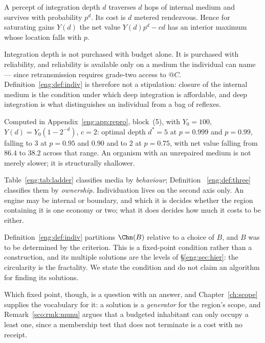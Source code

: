 \begin{proposition}
\label{eng:prop:fragile}
A percept of integration depth $d$ traverses $d$ hops of internal medium
and survives with probability $p^d$. Its cost is $d$ metered rendezvous.
Hence for saturating gains $Y(d)$ the net value $Y(d)p^d - cd$ has an
interior maximum whose location falls with $p$.
\end{proposition}

\begin{corollary}\label{eng:cor:owndepth}
Integration depth is not purchased with budget alone. It is purchased with
reliability, and reliability is available only on a medium the individual
can name --- since retransmission requires grade-two access to $@C$.
Definition~\ref{eng:def:indiv} is therefore not a stipulation: closure of the
internal medium is the condition under which deep integration is
affordable, and deep integration is what distinguishes an individual from a
bag of reflexes.
\end{corollary}

Computed in Appendix~\ref{eng:app:repro}, block~(5), with $Y_0 = 100$,
$Y(d) = Y_0(1-2^{-d})$, $c=2$: optimal depth $d^\ast = 5$ at $p = 0.999$
and $p=0.99$, falling to $3$ at $p = 0.95$ and $0.90$ and to $2$ at
$p = 0.75$, with net value falling from $86.4$ to $38.2$ across that range.
An organism with an unrepaired medium is not merely slower; it is
structurally shallower.

\begin{remark}\label{eng:two-axes}
Table~\ref{eng:tab:ladder} classifies media by \emph{behaviour}; Definition~
\ref{eng:def:three} classifies them by \emph{ownership}. Individuation lives on
the second axis only. An engine may be internal or boundary, and which it
is decides whether the region containing it is one economy or two; what it
does decides how much it costs to be either.
\end{remark}

\begin{remark}\label{eng:rem:fixpoint}
Definition~\ref{eng:def:indiv} partitions $\Chn(B)$ relative to a choice of
$B$, and $B$ was to be determined by the criterion. This is a fixed-point
condition rather than a construction, and its multiple solutions are the
levels of \S\ref{eng:sec:hier}: the circularity is the fractality. We state the
condition and do not claim an algorithm for finding its solutions.

Which fixed point, though, is a question with an answer, and
Chapter~\ref{ch:scope} supplies the vocabulary for it: a solution is a
\emph{generator} for the region's scope, and
Remark~\ref{sco:rmk:munu} argues that a budgeted inhabitant can only
occupy a least one, since a membership test that does not terminate is
a cost with no receipt.
\end{remark}

